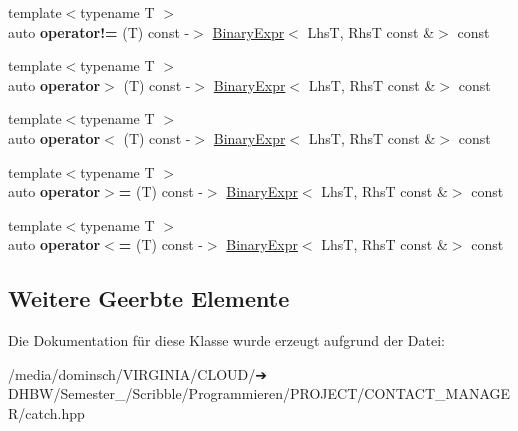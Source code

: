\begin{DoxyCompactItemize}
{\footnotesize template$<$typename T $>$ }\\auto {\bfseries operator!=} (T) const -\/$>$ \hyperlink{classCatch_1_1BinaryExpr}{Binary\+Expr}$<$ LhsT, RhsT const \&$>$ const
\item 
\mbox{\label{classCatch_1_1BinaryExpr_a70b66bfaa6df6f8d04e243fda3e0e1e4}} 
{\footnotesize template$<$typename T $>$ }\\auto {\bfseries operator$>$} (T) const -\/$>$ \hyperlink{classCatch_1_1BinaryExpr}{Binary\+Expr}$<$ LhsT, RhsT const \&$>$ const
\item 
\mbox{\label{classCatch_1_1BinaryExpr_a8328cde75134e02d7d44c5277db96c09}} 
{\footnotesize template$<$typename T $>$ }\\auto {\bfseries operator$<$} (T) const -\/$>$ \hyperlink{classCatch_1_1BinaryExpr}{Binary\+Expr}$<$ LhsT, RhsT const \&$>$ const
\item 
\mbox{\label{classCatch_1_1BinaryExpr_a334b84ac38c19c7c961a6d974a6c7d73}} 
{\footnotesize template$<$typename T $>$ }\\auto {\bfseries operator$>$=} (T) const -\/$>$ \hyperlink{classCatch_1_1BinaryExpr}{Binary\+Expr}$<$ LhsT, RhsT const \&$>$ const
\item 
\mbox{\label{classCatch_1_1BinaryExpr_a8773a729df3a465cad4e270e912db436}} 
{\footnotesize template$<$typename T $>$ }\\auto {\bfseries operator$<$=} (T) const -\/$>$ \hyperlink{classCatch_1_1BinaryExpr}{Binary\+Expr}$<$ LhsT, RhsT const \&$>$ const
\end{DoxyCompactItemize}
\subsection*{Weitere Geerbte Elemente}


Die Dokumentation für diese Klasse wurde erzeugt aufgrund der Datei\+:\begin{DoxyCompactItemize}
\item 
/media/dominsch/\+V\+I\+R\+G\+I\+N\+I\+A/\+C\+L\+O\+U\+D/➔ D\+H\+B\+W/\+Semester\+\_/\+Scribble/\+Programmieren/\+P\+R\+O\+J\+E\+C\+T/\+C\+O\+N\+T\+A\+C\+T\+\_\+\+M\+A\+N\+A\+G\+E\+R/catch.\+hpp\end{DoxyCompactItemize}
